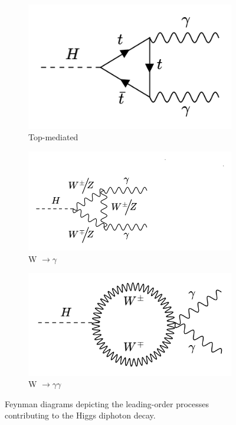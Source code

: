 \begin{figure}[htp]
  \centering
       \begin{subfigure}[b]{0.3\textwidth}
         \centering
         \includegraphics[width=\textwidth]{figures/theory_chapter/toploop.png}
         \caption{Top-mediated}
         \label{fig:toploop}
     \end{subfigure}
     \hfill
         \begin{subfigure}[b]{0.3\textwidth}
         \centering
         \includegraphics[width=\textwidth]{figures/theory_chapter/Wloop1.png}
         \caption{W $\rightarrow \gamma$ }
         \label{fig:Wloop1}
     \end{subfigure}
     \hfill 
        \begin{subfigure}[b]{0.3\textwidth}
         \centering
         \includegraphics[width=\textwidth]{figures/theory_chapter/Wloop2.png}
         \caption{W $\rightarrow \gamma \gamma$}
         \label{fig:Wloop2}
     \end{subfigure}
     \hfill
  \label{fig:loopmodes}
  \caption{Feynman diagrams depicting the leading-order processes contributing to the Higgs diphoton decay.}  
\end{figure}

